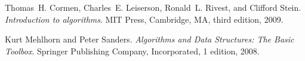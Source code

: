 
\begin{DoxyDescription}
\item[\label{_CITEREF_CormenLeisersonRivestStein2009}%
\mbox{[}1\mbox{]}]Thomas~H. Cormen, Charles~E. Leiserson, Ronald~L. Rivest, and Clifford Stein. {\itshape Introduction to algorithms}. M\+IT Press, Cambridge, MA, third edition, 2009.


\item[\label{_CITEREF_MehlhornSanders2008}%
\mbox{[}2\mbox{]}]Kurt Mehlhorn and Peter Sanders. {\itshape Algorithms and Data Structures\+: The Basic Toolbox}. Springer Publishing Company, Incorporated, 1 edition, 2008.


\end{DoxyDescription}